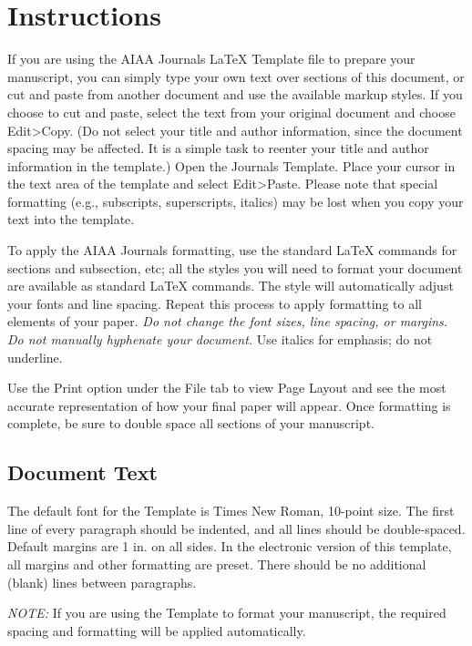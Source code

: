 \documentclass[journal]{new-aiaa}
\begin{document}
\section{Instructions}

If you are using the AIAA Journals \LaTeX{} Template file to prepare your manuscript, you can simply type your own text over sections of this document, or cut and paste from another document and use the available markup styles. If you choose to cut and paste, select the text from your original document and choose Edit>Copy. (Do not select your title and author information, since the document spacing may be affected. It is a simple task to reenter your title and author information in the template.) Open the Journals Template. Place your cursor in the text area of the template and select Edit>Paste. Please note that special formatting (e.g., subscripts, superscripts, italics) may be lost when you copy your text into the template.

To apply the AIAA Journals formatting, use the standard \LaTeX{} commands for sections and subsection, etc; all the styles you will need to format your document are available as standard \LaTeX{} commands. The style will automatically adjust your fonts and line spacing. Repeat this process to apply formatting to all elements of your paper. \emph{Do not change the font sizes, line spacing, or margins. Do not manually hyphenate your document.} Use italics for emphasis; do not underline. 

Use the Print option under the File tab to view Page Layout and see the most accurate representation of how your final paper will appear. Once formatting is complete, be sure to double space all sections of your manuscript.


\subsection{Document Text}
The default font for the Template is Times New Roman, 10-point size. The first line of every paragraph should be indented, and all lines should be double-spaced. Default margins are 1 in. on all sides. In the electronic version of this template, all margins and other formatting are preset. There should be no additional (blank) lines between paragraphs.

\emph{NOTE:} If you are using the Template to format your manuscript, the required spacing and formatting will be applied automatically.
\end{document}
